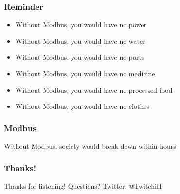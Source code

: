 \documentclass[aspectratio=169]{beamer}
\begin{document}
\begin{frame}
	\frametitle{Reminder}
	\begin{itemize}
		\item Without Modbus, you would have no power
		\item Without Modbus, you would have no water
		\item Without Modbus, you would have no ports
		\item Without Modbus, you would have no medicine
		\item Without Modbus, you would have no processed food
		\item Without Modbus, you would have no clothes
	\end{itemize}
\end{frame}

\begin{frame}
	\frametitle{Modbus}
	\centering
	\vfill
	Without Modbus, society would break down within hours
	\vfill
\end{frame}

\begin{frame}
	\frametitle{Thanks!}
		\begin{center}
			\vfill
			Thanks for listening!
			\vfill
			Questions?
			\vfill
			Twitter: @TwitchiH
			\vfill
		\end{center}
\end{frame}
\end{document}
